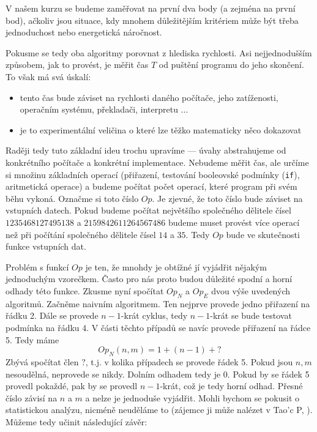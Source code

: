 V našem kurzu se budeme zaměřovat na první dva body (a zejména na první bod), ačkoliv jsou situace, kdy mnohem důležitějším
kritériem může být třeba jednoduchost nebo energetická náročnost.  

Pokusme se tedy oba algoritmy porovnat z hlediska rychlosti. Asi nejjednodušším způsobem,
jak to provést, je měřit čas $T$ od puštění programu do jeho skončení. To však má svá úskalí:

\begin{itemize}
 \item tento čas bude záviset na rychlosti daného počítače, jeho zatíženosti, operačním systému, překladači, interpretu ...
 \item je to experimentální veličina o které lze těžko matematicky něco dokazovat
\end{itemize}

Raději tedy tuto základní ideu trochu upravíme --- úvahy abstrahujeme od konkrétního 
počítače a konkrétní implementace. Nebudeme měřit čas, ale určíme si množinu 
základních operací (přiřazení, testování booleovské podmínky ({\tt if}), aritmetická operace) a budeme počítat 
počet operací,  které program při svém běhu vykoná. Označme si toto číslo $Op$. Je zjevné, že 
toto číslo bude záviset na vstupních datech. Pokud budeme počítat největšího společného dělitele čísel
$1235468127495138$ a $2159842611264567486$ budeme muset provést více operací než při počítání společného dělitele čísel
$14$ a $35$. Tedy $Op$ bude ve skutečnosti funkce vstupních dat.

Problém s funkcí $Op$ je ten, že mnohdy je obtížné jí vyjádřit nějakým jednoduchým vzorečkem. Často pro nás proto budou
důležité spodní a horní odhady této funkce. Zkusme nyní spočítat $Op_N$ a $Op_E$ dvou výše uvedených algoritmů. Začněme
naivním algoritmem. Ten nejprve provede jedno přiřazení na řádku 2. Dále se provede $n-1$-krát cyklus, tedy $n-1$-krát
se bude testovat podmínka na řádku 4. V části těchto případů se navíc provede přiřazení na řádce 5. Tedy máme
\begin{displaymath}
 Op_N(n,m) = 1 + (n-1) + ?
\end{displaymath}
Zbývá spočítat člen $?$, t.j. v kolika případech se provede řádek 5. Pokud jsou $n,m$ nesoudělná, neprovede se nikdy.
Dolním odhadem tedy je $0$. Pokud by se řádek 5 provedl pokaždé, pak by se provedl $n-1$-krát, což je tedy horní odhad.
Přesné číslo závisí na $n$ a $m$ a nelze je jednoduše vyjádřit. Mohli bychom se pokusit o statistickou analýzu, nicméně
neuděláme to (zájemce ji může nalézet v Tao'c P, \cite{TAOCP2}). Můžeme tedy učinit následující závěr:

